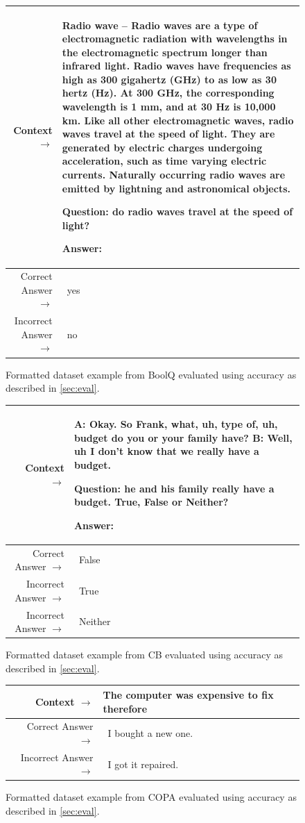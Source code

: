 \documentclass{article}
\begin{document}
\begin{figure}[!h] { \tt \footnotesize \begin{tabularx}{\linewidth}{r X} \toprule Context $\to$ & Radio wave -- Radio waves are a type of electromagnetic radiation with wavelengths in the electromagnetic spectrum longer than infrared light. Radio waves have frequencies as high as 300 gigahertz (GHz) to as low as 30 hertz (Hz). At 300 GHz, the corresponding wavelength is 1 mm, and at 30 Hz is 10,000 km. Like all other electromagnetic waves, radio waves travel at the speed of light. They are generated by electric charges undergoing acceleration, such as time varying electric currents. Naturally occurring radio waves are emitted by lightning and astronomical objects.

Question: do radio waves travel at the speed of light?

Answer:\\
\midrule 
Correct Answer $\to$ & ~yes \\ 
Incorrect Answer $\to$ & ~no \\
\bottomrule \end{tabularx} }
\caption{Formatted dataset example from BoolQ evaluated using accuracy as described in \autoref{sec:eval}.}  
\label{eval:boolq}  
\end{figure}



\begin{figure}[!h] { \tt \footnotesize \begin{tabularx}{\linewidth}{r X} \toprule Context $\to$ & A: Okay. So Frank, what, uh, type of, uh, budget do you or your family have? B: Well, uh I don't know that we really have a budget.

Question: he and his family really have a budget. True, False or Neither?

Answer:\\
\midrule 
Correct Answer $\to$ & ~False \\ 
Incorrect Answer $\to$ & ~True \\
Incorrect Answer $\to$ & ~Neither \\
\bottomrule \end{tabularx} }
\caption{Formatted dataset example from CB evaluated using accuracy as described in \autoref{sec:eval}.}  
\label{eval:cb}  
\end{figure}

\begin{figure}[!h] { \tt \footnotesize \begin{tabularx}{\linewidth}{r X} \toprule Context $\to$ & The computer was expensive to fix therefore \\
\midrule 
Correct Answer $\to$ & ~I bought a new one. \\ 
Incorrect Answer $\to$ & ~I got it repaired. \\
\bottomrule \end{tabularx} }
\caption{Formatted dataset example from COPA evaluated using accuracy as described in \autoref{sec:eval}.}  
\label{eval:copa}  
\end{figure}
\end{document}
